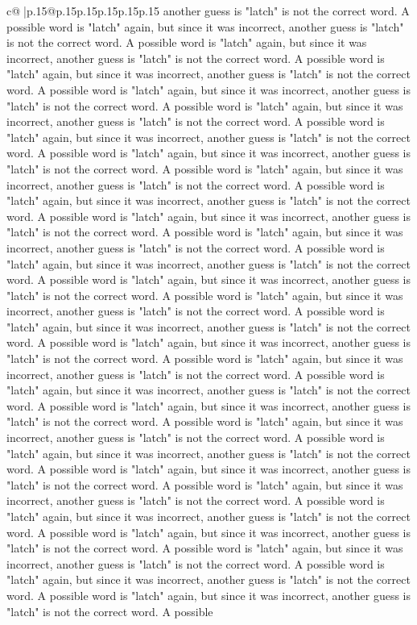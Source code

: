 \documentclass{article}
\begin{document}
{\begin{supertabular}{c@{$\;$}|p{.15\linewidth}@{}p{.15\linewidth}p{.15\linewidth}p{.15\linewidth}p{.15\linewidth}p{.15\linewidth}}
{{{another guess is "latch" is not the correct word. A possible word is "latch" again, but since it was incorrect, another guess is "latch" is not the correct word. A possible word is "latch" again, but since it was incorrect, another guess is "latch" is not the correct word. A possible word is "latch" again, but since it was incorrect, another guess is "latch" is not the correct word. A possible word is "latch" again, but since it was incorrect, another guess is "latch" is not the correct word. A possible word is "latch" again, but since it was incorrect, another guess is "latch" is not the correct word. A possible word is "latch" again, but since it was incorrect, another guess is "latch" is not the correct word. A possible word is "latch" again, but since it was incorrect, another guess is "latch" is not the correct word. A possible word is "latch" again, but since it was incorrect, another guess is "latch" is not the correct word. A possible word is "latch" again, but since it was incorrect, another guess is "latch" is not the correct word. A possible word is "latch" again, but since it was incorrect, another guess is "latch" is not the correct word. A possible word is "latch" again, but since it was incorrect, another guess is "latch" is not the correct word. A possible word is "latch" again, but since it was incorrect, another guess is "latch" is not the correct word. A possible word is "latch" again, but since it was incorrect, another guess is "latch" is not the correct word. A possible word is "latch" again, but since it was incorrect, another guess is "latch" is not the correct word. A possible word is "latch" again, but since it was incorrect, another guess is "latch" is not the correct word. A possible word is "latch" again, but since it was incorrect, another guess is "latch" is not the correct word. A possible word is "latch" again, but since it was incorrect, another guess is "latch" is not the correct word. A possible word is "latch" again, but since it was incorrect, another guess is "latch" is not the correct word. A possible word is "latch" again, but since it was incorrect, another guess is "latch" is not the correct word. A possible word is "latch" again, but since it was incorrect, another guess is "latch" is not the correct word. A possible word is "latch" again, but since it was incorrect, another guess is "latch" is not the correct word. A possible word is "latch" again, but since it was incorrect, another guess is "latch" is not the correct word. A possible word is "latch" again, but since it was incorrect, another guess is "latch" is not the correct word. A possible word is "latch" again, but since it was incorrect, another guess is "latch" is not the correct word. A possible word is "latch" again, but since it was incorrect, another guess is "latch" is not the correct word. A possible word is "latch" again, but since it was incorrect, another guess is "latch" is not the correct word. A possible word is "latch" again, but since it was incorrect, another guess is "latch" is not the correct word. A possible word is "latch" again, but since it was incorrect, another guess is "latch" is not the correct word. A possible }}}
\end{supertabular}}
\end{document}
